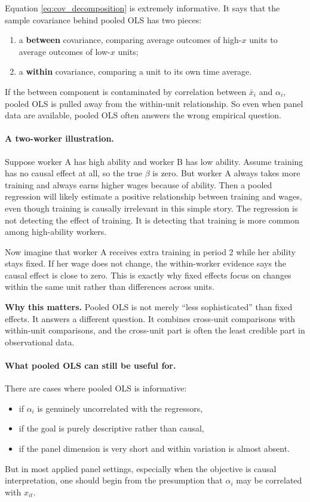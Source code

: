 Equation \eqref{eq:cov_decomposition} is extremely informative. It says that the sample covariance behind pooled \ac{OLS} has two pieces:
\begin{enumerate}
\item a \textbf{between} covariance, comparing average outcomes of high-$x$ units to average outcomes of low-$x$ units;
\item a \textbf{within} covariance, comparing a unit to its own time average.
\end{enumerate}
If the between component is contaminated by correlation between $\bar{x}_i$ and $\alpha_i$, pooled \ac{OLS} is pulled away from the within-unit relationship. So even when panel data are available, pooled \ac{OLS} often answers the wrong empirical question.

\paragraph{A two-worker illustration.}
Suppose worker A has high ability and worker B has low ability. Assume training has no causal effect at all, so the true $\beta$ is zero. But worker A always takes more training and always earns higher wages because of ability. Then a pooled regression will likely estimate a positive relationship between training and wages, even though training is causally irrelevant in this simple story. The regression is not detecting the effect of training. It is detecting that training is more common among high-ability workers.

Now imagine that worker A receives extra training in period 2 while her ability stays fixed. If her wage does not change, the within-worker evidence says the causal effect is close to zero. This is exactly why fixed effects focus on changes within the same unit rather than differences across units.

\begin{boxD}
\textbf{Why this matters.}
Pooled \ac{OLS} is not merely ``less sophisticated'' than fixed effects. It answers a different question. It combines cross-unit comparisons with within-unit comparisons, and the cross-unit part is often the least credible part in observational data.
\end{boxD}

\paragraph{What pooled \ac{OLS} can still be useful for.}
There are cases where pooled \ac{OLS} is informative:
\begin{itemize}
\item if $\alpha_i$ is genuinely uncorrelated with the regressors,
\item if the goal is purely descriptive rather than causal,
\item if the panel dimension is very short and within variation is almost absent.
\end{itemize}
But in most applied panel settings, especially when the objective is causal interpretation, one should begin from the presumption that $\alpha_i$ may be correlated with $x_{it}$.

